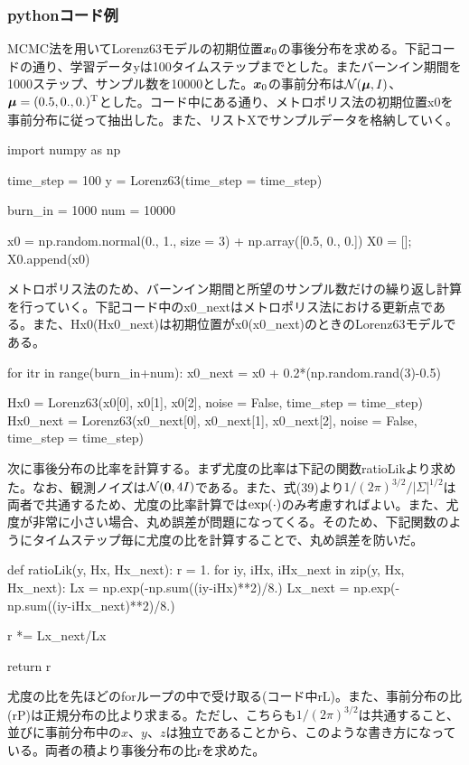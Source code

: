 \documentclass[dvipdfmx, 9pt, a4paper]{jsarticle}
\newcommand{\bm}[1]{{\mbox{\boldmath $#1$}}}
\begin{document}
\subsubsection{pythonコード例}
MCMC法を用いてLorenz63モデルの初期位置$\bm x_0$の事後分布を求める。下記コードの通り、学習データyは100タイムステップまでとした。またバーンイン期間を1000ステップ、サンプル数を10000とした。$\bm x_0$の事前分布は$\mathcal{N}(\bm \mu, I)$、$\bm \mu=(0.5, 0., 0.)^{\rm T}$とした。コード中にある通り、メトロポリス法の初期位置x0を事前分布に従って抽出した。また、リストXでサンプルデータを格納していく。\bigskip
\begin{python}
import numpy as np

time_step = 100
y = Lorenz63(time_step = time_step)

burn_in = 1000
num = 10000

x0 = np.random.normal(0., 1., size = 3) + np.array([0.5, 0., 0.])
X0 = []; X0.append(x0)
\end{python}\bigskip
メトロポリス法のため、バーンイン期間と所望のサンプル数だけの繰り返し計算を行っていく。下記コード中のx0\_nextはメトロポリス法における更新点である。また、Hx0(Hx0\_next)は初期位置がx0(x0\_next)のときのLorenz63モデルである。\bigskip
\begin{python}
for itr in range(burn_in+num):
	x0_next = x0 + 0.2*(np.random.rand(3)-0.5)

	Hx0 = Lorenz63(x0[0], x0[1], x0[2], noise = False, time_step = time_step)
	Hx0_next = Lorenz63(x0_next[0], 
		x0_next[1], x0_next[2], noise = False, time_step = time_step)
\end{python}\bigskip
次に事後分布の比率を計算する。まず尤度の比率は下記の関数ratioLikより求めた。なお、観測ノイズは$\mathcal{N}(\bm 0, 4I)$である。また、式(39)より$1/(2\pi)^{3/2}/|\Sigma|^{1/2}$は両者で共通するため、尤度の比率計算では${\rm exp}(\cdot)$のみ考慮すればよい。また、尤度が非常に小さい場合、丸め誤差が問題になってくる。そのため、下記関数のようにタイムステップ毎に尤度の比を計算することで、丸め誤差を防いだ。\bigskip
\begin{python}
def ratioLik(y, Hx, Hx_next):
	r = 1.
	for iy, iHx, iHx_next in zip(y, Hx, Hx_next):
		Lx = np.exp(-np.sum((iy-iHx)**2)/8.)
		Lx_next = np.exp(-np.sum((iy-iHx_next)**2)/8.)

		r *= Lx_next/Lx

	return r
\end{python}\bigskip
尤度の比を先ほどのforループの中で受け取る(コード中rL)。また、事前分布の比(rP)は正規分布の比より求まる。ただし、こちらも$1/(2\pi)^{3/2}$は共通すること、並びに事前分布中の$x$、$y$、$z$は独立であることから、このような書き方になっている。両者の積より事後分布の比rを求めた。\bigskip
\end{document}
